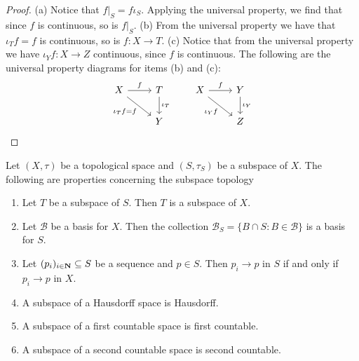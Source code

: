 \begin{proof}
    (a) Notice that \(f|_S = f  \iota_S\). Applying the universal property,
    we find that since \(f\) is continuous, so is \(f|_S\). (b) From the universal
    property we have that \(\iota_T  f = f\) is continuous, so is \(f: X \to
    T\). (c) Notice that from the universal property we have \(\iota_Y  f: X
    \to Z\) continuous, since \(f\) is continuous. The following are the universal
    property diagrams for items (b) and (c):
    \[
        \begin{tikzcd}
            X \rar["f"] \ar[rd, swap, "\iota_T  f = f"] &T \dar["\iota_T"] \\ &Y
        \end{tikzcd}
        \qquad
        \begin{tikzcd}
            X \rar["f"] \ar[rd, swap, "\iota_Y  f"] &Y \dar["\iota_Y"] \\ &Z
        \end{tikzcd}
    \]
\end{proof}

\begin{proposition}\label{prop: subspace properties}
    Let \((X, \tau)\) be a topological space and \((S, \tau_S)\) be a
    subspace of \(X\). The following are properties concerning the subspace
    topology
    \begin{enumerate}[(SP1)]\setlength\itemsep{0em}
        \item\label{prop: subspace transitivity} Let \(T\) be a subspace of \(S\). Then
        \(T\) is a subspace of \(X\).  \item\label{prop: basis for subspace} Let
        \(\mathcal B\) be a basis for \(X\). Then the collection
        \(\mathcal B_S = \{B \cap S \colon B \in \mathcal B\}\) is a basis for \(S\).
        \item\label{prop: convergence subspace}
        Let \((p_i)_{i \in \mathbf{N}} \subseteq S\) be a sequence and \(p \in
        S\). Then \(p_i \to p\) in \(S\) if and only if \(p_i \to p\) in \(X\).
        \item\label{prop: Hausdorff implies Hausdorff subspace}
        A subspace of a Hausdorff space is Hausdorff.
        \item\label{prop: firs count implies first count subspace}
        A subspace of a first countable space is first countable.
        \item\label{prop: sec count implies sec count subspace}
        A subspace of a second countable space is second countable.
    \end{enumerate}
\end{proposition}

